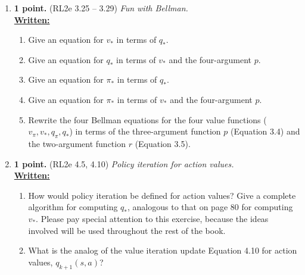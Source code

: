 \documentclass{article}
\begin{document}
\begin{enumerate}
	\item \textbf{1 point.} (RL2e 3.25 -- 3.29) \textit{Fun with Bellman.} \\
	      \uline{\textbf{Written:}}
	      \begin{enumerate}
		      \item Give an equation for $v_*$ in terms of $q_*$.

		      \item Give an equation for $q_*$ in terms of $v_*$ and the four-argument $p$.

		      \item Give an equation for $\pi_*$ in terms of $q_*$.

		      \item Give an equation for $\pi_*$ in terms of $v_*$ and the four-argument $p$.

		      \item Rewrite the four Bellman equations for the four value functions ($v_\pi, v_*, q_\pi, q_*$) in terms of the three-argument function $p$ (Equation 3.4) and the two-argument function $r$ (Equation 3.5).

	      \end{enumerate}

	\item \textbf{1 point.} (RL2e 4.5, 4.10) \textit{Policy iteration for action values.} \\
	      \uline{\textbf{Written:}}
	      \begin{enumerate}
		      \item How would policy iteration be defined for action values? Give a complete algorithm for computing $q_*$, analogous to that on page $80$ for computing $v_*$. Please pay special attention to this exercise, because the ideas involved will be used throughout the rest of the book.

		      \item What is the analog of the value iteration update Equation 4.10 for action values, $q_{k+1}(s,a)$?

	      \end{enumerate}


\end{enumerate}
\end{document}
